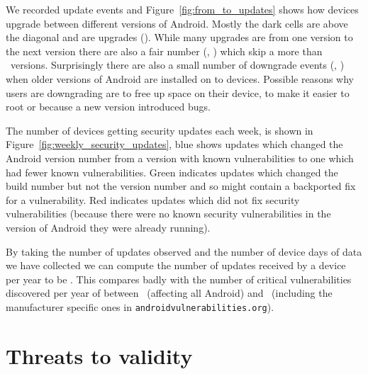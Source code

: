 \documentclass[conference,a4paper,twoside]{IEEEtran}
\newcommand{\avo}{\texttt{androidvulnerabilities.org}}
\begin{document}
We recorded update events and Figure~\ref{fig:from_to_updates} shows how devices upgrade between different versions of Android.
Mostly the dark cells are above the diagonal and are upgrades (\daNumUpdatesUpgrades).
While many upgrades are from one version to the next version there are also a fair number (\daNumUpdatesBigUpgrades, \daPercBigUpgrades) which skip a more than \daNumUpdatesSkippedBig\ versions.
Surprisingly there are also a small number of downgrade events (\daNumUpdatesDowngrades, \daPercUpdatesDowngrades) when older versions of Android are installed on to devices.
Possible reasons why users are downgrading are to free up space on their device, to make it easier to root or because a new version introduced bugs.

The number of devices getting security updates each week, is shown in Figure~\ref{fig:weekly_security_updates}, blue shows updates which changed the Android version number from a version with known vulnerabilities to one which had fewer known vulnerabilities.
Green indicates updates which changed the build number but not the version number and so might contain a backported fix for a vulnerability.
Red indicates updates which did not fix security vulnerabilities (because there were no known security vulnerabilities in the version of Android they were already running).

By taking the number of updates observed and the number of device days of data we have collected we can compute the number of updates received by a device per year to be \daUpdatesPerYear.
This compares badly with the number of critical vulnerabilities discovered per year of between \avoVulnsPerYearAllAndroid\ (affecting all Android) and \avoVulnsPerYear\ (including the manufacturer specific ones in \avo).





\section{Threats to validity}
\end{document}
